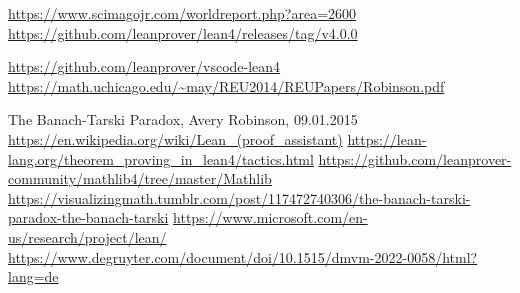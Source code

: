 \documentclass[10pt]{article}
\begin{document}
\renewcommand\refname{Quellenverzeichnis}
\begin{thebibliography}{99}
\url{https://www.scimagojr.com/worldreport.php?area=2600}
\url{https://github.com/leanprover/lean4/releases/tag/v4.0.0}\par
{}
\url{https://github.com/leanprover/vscode-lean4}
\url{https://math.uchicago.edu/~may/REU2014/REUPapers/Robinson.pdf} \par
The Banach-Tarski Paradox, Avery Robinson, 09.01.2015
\url{https://en.wikipedia.org/wiki/Lean_(proof_assistant)}
 \url{https://lean-lang.org/theorem_proving_in_lean4/tactics.html}
 \url{https://github.com/leanprover-community/mathlib4/tree/master/Mathlib}
\url{https://visualizingmath.tumblr.com/post/117472740306/the-banach-tarski-paradox-the-banach-tarski}
\url{https://www.microsoft.com/en-us/research/project/lean/}
\url{https://www.degruyter.com/document/doi/10.1515/dmvm-2022-0058/html?lang=de}
\end{thebibliography}

\end{document}
